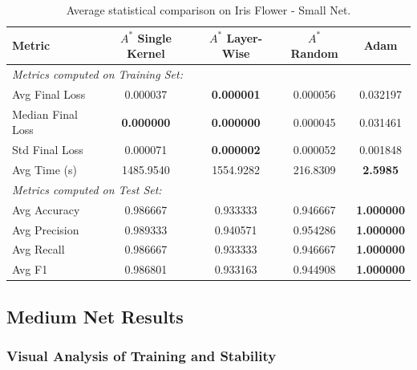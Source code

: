 \begin{table}[htbp]
\centering
\scriptsize
\begin{tabular}{|l|c|c|c|c|}
\hline
\textbf{Metric}   & \textbf{$A^*$ Single Kernel} & \textbf{$A^*$ Layer-Wise} & \textbf{$A^*$ Random} & \textbf{Adam} \\ \hline
\multicolumn{5}{|l|}{\textit{Metrics computed on Training Set:}} \\ \hline
Avg Final Loss          & 0.000037                     & \textbf{0.000001}         & 0.000056              & 0.032197      \\ 
Median Final Loss       & \textbf{0.000000}            & \textbf{0.000000}         & 0.000045              & 0.031461      \\
Std Final Loss          & 0.000071                     & \textbf{0.000002}         & 0.000052              & 0.001848      \\ \hline
Avg Time (s)            & 1485.9540                    & 1554.9282                 & 216.8309              & \textbf{2.5985} \\ \hline
\multicolumn{5}{|l|}{\textit{Metrics computed on Test Set:}} \\ \hline
Avg Accuracy            & 0.986667                     & 0.933333                  & 0.946667              & \textbf{1.000000} \\ 
Avg Precision           & 0.989333                     & 0.940571                  & 0.954286              & \textbf{1.000000} \\ 
Avg Recall              & 0.986667                     & 0.933333                  & 0.946667              & \textbf{1.000000} \\ 
Avg F1                  & 0.986801                     & 0.933163                  & 0.944908              & \textbf{1.000000} \\ \hline
\end{tabular}
\caption{Average statistical comparison on Iris Flower - Small Net.}
\label{tab:small_net_iris}
\end{table}

\newpage

\subsection{Medium Net Results}

\subsubsection{Visual Analysis of Training and Stability}

